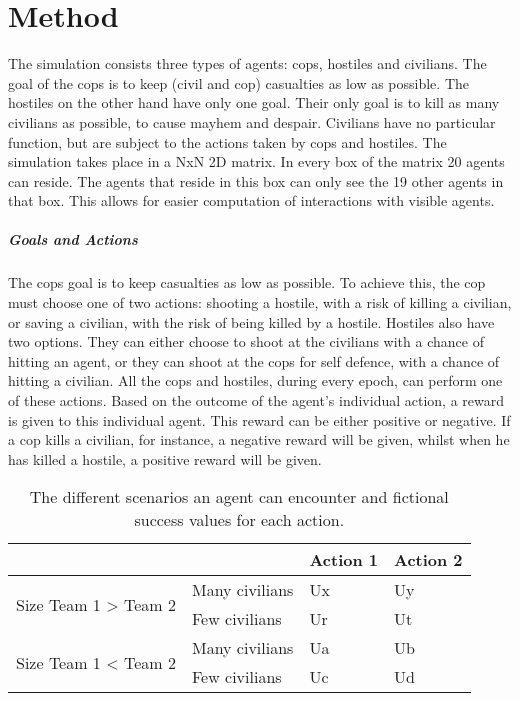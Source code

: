\chapter{Method}
The simulation consists three types of agents: cops, hostiles and civilians. The goal of the cops is to keep (civil and cop) casualties as low as possible. The hostiles on the other hand have only one goal. Their only goal is to kill as many civilians as possible, to cause mayhem and despair. Civilians have no particular function, but are subject to the actions taken by cops and hostiles. The simulation takes place in a NxN 2D matrix. In every box of the matrix 20 agents can reside. The agents that reside in this box can only see the 19 other agents in that box. This allows for easier computation of interactions with visible agents. 

\paragraph{Goals and Actions}
The cops goal is to keep casualties as low as possible. To achieve this, the cop must choose one of two actions: shooting a hostile, with a risk of killing a civilian, or saving a civilian, with the risk of being killed by a hostile. Hostiles also have two options. They can either choose to shoot at the civilians with a chance of hitting an agent, or they can shoot at the cops for self defence, with a chance of hitting a civilian. All the cops and hostiles, during every epoch, can perform one of these actions. Based on the outcome of the agent's individual action, a reward is given to this individual agent. This reward can be either positive or negative. If a cop kills a civilian, for instance, a negative reward will be given, whilst when he has killed a hostile, a positive reward will be given. 

\begin{table}[!ht]
\begin{center}
\begin{tabular}{l l | l l}
\hline
 & & Action 1 & Action 2 \\
\hline
\multirow{2}{*}{Size Team 1 > Team 2} & Many civilians & Ux & Uy \\
 & Few civilians & Ur & Ut \\
\hline
\multirow{2}{*}{Size Team 1 < Team 2} & Many civilians & Ua & Ub\\
 & Few civilians & Uc & Ud\\
\hline
\end{tabular}
\caption{The different scenarios an agent can encounter and fictional success values for each action.}
\label{tab:scenarios}
\end{center}
\end{table}


